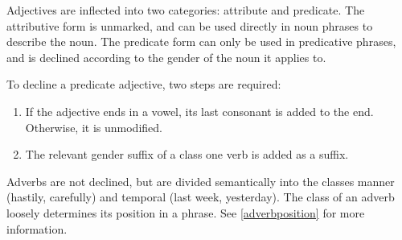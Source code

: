 Adjectives are inflected into two categories: attribute and predicate. The
attributive form is unmarked, and can be used directly in noun phrases to
describe the noun. The predicate form can only be used in predicative phrases,
and is declined according to the gender of the noun it applies to.

To decline a predicate adjective, two steps are required:

\begin{enumerate}
\item If the adjective ends in a vowel, its last consonant is added to the end. Otherwise, it is unmodified.
\item The relevant gender suffix of a class one verb is added as a suffix.
\end{enumerate}

Adverbs are not declined, but are divided semantically into the classes manner
(hastily, carefully) and temporal (last week, yesterday). The class of an adverb
loosely determines its position in a phrase. See \ref{adverbposition} for more
information.
